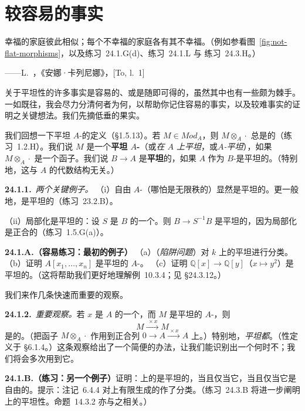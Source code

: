 
\section{较容易的事实}

\epigraph{幸福的家庭彼此相似；每个不幸福的家庭各有其不幸福。（例如参看图~\ref{fig:not-flat-morphisms}，以及\mbox{练习~24.1.G}(d)、\mbox{练习~24.1.L} 与 \mbox{练习~24.3.H}。）}{——L.~\trTolstoy，《安娜·卡列尼娜》，[To, l.~1]}

关于平坦性的许多事实是容易的、或是随即可得的，虽然其中也有一些颇为棘手。一如既往，我会尽力分清何者为何，以帮助你记住容易的事实，以及较难事实的证明之关键想法。我们先摘低垂的果实。

我们回想一下平坦 $A$-\trModule{}的定义（\S1.5.13）。若 $M\in\mathit{Mod}_A$，则 $M\otimes_A\cdot$ 总是\trRightExact{}的（\mbox{练习~1.2.H}）。我们说 $M$ 是一个\textbf{平坦 $A$-\trModule}（或\emph{在 $A$ 上平坦}，或\emph{$A$-平坦}），如果 $M\otimes_A\cdot$ 是一个\trExact{}函子。我们说\trRingMorphism{} $B\to A$ 是\textbf{平坦}的，如果 $A$ 作为 $B$-\trModule{}是平坦的。（特别地，这与 $A$ 的代数结构无关。）

\textbf{24.1.1.}\ \emph{两个关键例子。}\quad
（i）自由 $A$-\trModule{}（哪怕是无限秩的）显然是平坦的。更一般地，\trProjectiveObj{}\trModule{}是平坦的（\mbox{练习~23.2.B}）。

（ii）局部化是平坦的：设 $S$ 是 $B$ 的一个\trMultiplicativeSubset。则 $B\to S^{-1}B$ 是平坦的\trRingMorphism，因为局部化是正合的（\mbox{练习~1.5.G}(a)）。

\textbf{24.1.A.（容易练习：最初的例子）}\quad
（a）（\emph{陷阱问题}）对\trField{} $k$ 上的平坦\trModule{}进行分类。
（b）证明 $A[x_1,\dots,x_n]$ 是平坦的 $A$-\trModule。
（c）证明\trRingMorphism{} $\mathbb{Q}[x]\to\mathbb{Q}[y]$（$x\mapsto y^{2}$）是平坦的。（这将帮助我们更好地理解\mbox{例~10.3.4}；见 \S24.3.12。）

我们来作几条快速而重要的观察。

\textbf{24.1.2.}\ \emph{重要观察。}\quad 若 $x$ 是 $A$ 的一个\trNonZerodivisor，而 $M$ 是平坦的 $A$-\trModule，则
\[
M \xrightarrow{\ \times x\ } M
\]
是\trInjectiveMap{}的。（把\trExact{}函子 $M\otimes_A\cdot$ 作用到正合列 $0\longrightarrow A\xrightarrow{\ \times x\ }A$ 上。）特别地，\emph{平坦\trModule{}都\trTorsionFree}。（\trTorsionFree{}性定义于 \S6.1.4。）这条观察给出了一个简便的办法，让我们能识别出一个\trModule{}何时不\trFlat；我们将会多次用到它。

\textbf{24.1.B.（练习：另一个例子）}\quad 证明：\trPID{}上\trFinitelyGenerated{}的\trModule{}是平坦的，当且仅当它\trTorsionFree，当且仅当它是自由的。提示：\mbox{注记~6.4.4} 对\trPID{}上有限生成的\trModule{}作了分类。（\mbox{练习~24.3.B} 将进一步阐明\trPID{}上的平坦性。\mbox{命题~14.3.2} 亦与之相关。）

